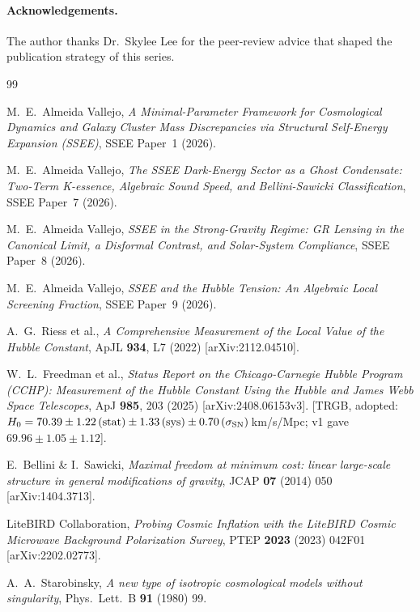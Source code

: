 \documentclass[12pt,a4paper]{article}
\begin{document}
\paragraph{Acknowledgements.}
The author thanks Dr.\ Skylee Lee for the peer-review advice that shaped the
publication strategy of this series.

\clearpage

\begin{thebibliography}{99}

M.~E.~Almeida Vallejo,
\emph{A Minimal-Parameter Framework for Cosmological Dynamics and Galaxy
Cluster Mass Discrepancies via Structural Self-Energy Expansion (SSEE)},
SSEE Paper~1 (2026).

M.~E.~Almeida Vallejo,
\emph{The SSEE Dark-Energy Sector as a Ghost Condensate: Two-Term K-essence,
Algebraic Sound Speed, and Bellini-Sawicki Classification},
SSEE Paper~7 (2026).

M.~E.~Almeida Vallejo,
\emph{SSEE in the Strong-Gravity Regime: GR Lensing in the Canonical Limit,
a Disformal Contrast, and Solar-System Compliance},
SSEE Paper~8 (2026).

M.~E.~Almeida Vallejo,
\emph{SSEE and the Hubble Tension: An Algebraic Local Screening Fraction},
SSEE Paper~9 (2026).

A.~G.~Riess et al.,
\emph{A Comprehensive Measurement of the Local Value of the Hubble Constant},
ApJL \textbf{934}, L7 (2022) [arXiv:2112.04510].

W.~L.~Freedman et al.,
\emph{Status Report on the Chicago-Carnegie Hubble Program (CCHP): Measurement of the Hubble Constant Using the Hubble and James Webb Space Telescopes},
ApJ \textbf{985}, 203 (2025) [arXiv:2408.06153v3].
[TRGB, adopted: $H_0 = 70.39\pm1.22\,(\mathrm{stat})\pm1.33\,(\mathrm{sys})\pm0.70\,(\sigma_{\rm SN})$\,km/s/Mpc; v1 gave $69.96\pm1.05\pm1.12$].

E.~Bellini \& I.~Sawicki,
\emph{Maximal freedom at minimum cost: linear large-scale structure in general modifications of gravity},
JCAP \textbf{07} (2014) 050 [arXiv:1404.3713].

LiteBIRD Collaboration,
\emph{Probing Cosmic Inflation with the LiteBIRD Cosmic Microwave Background
Polarization Survey},
PTEP \textbf{2023} (2023) 042F01 [arXiv:2202.02773].

A.~A.~Starobinsky,
\emph{A new type of isotropic cosmological models without singularity},
Phys.\ Lett.\ B \textbf{91} (1980) 99.


\end{thebibliography}
\end{document}
